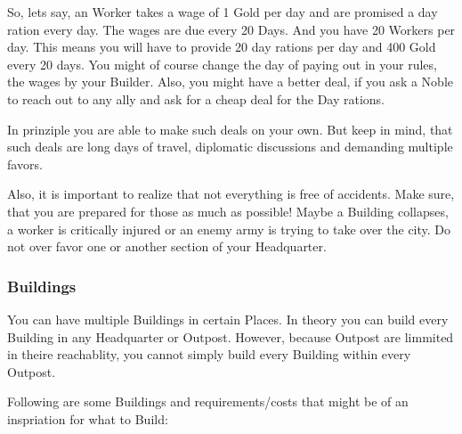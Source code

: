 \documentclass[10pt,twoside,twocolumn,openany]{book}
\begin{document}
So, lets say, an Worker takes a wage of 1 Gold per day and are promised a day ration every day. The wages are due every 20 Days. And you have 20 Workers per day. This means you will have to provide 20 day rations per day and 400 Gold every 20 days. You might of course change the day of paying out in your rules, the wages by your Builder. Also, you might have a better deal, if you ask a Noble to reach out to any ally and ask for a cheap deal for the Day rations.

In prinziple you are able to make such deals on your own. But keep in mind, that such deals are long days of travel, diplomatic discussions and demanding multiple favors.

Also, it is important to realize that not everything is free of accidents. Make sure, that you are prepared for those as much as possible! Maybe a Building collapses, a worker is critically injured or an enemy army is trying to take over the city. Do not over favor one or another section of your Headquarter.

\subsubsection{Buildings}

You can have multiple Buildings in certain Places. In theory you can build every Building in any Headquarter or Outpost. However, because Outpost are limmited in theire reachablity, you cannot simply build every Building within every Outpost.

Following are some Buildings and requirements/costs that might be of an inspriation for what to Build:
\end{document}
